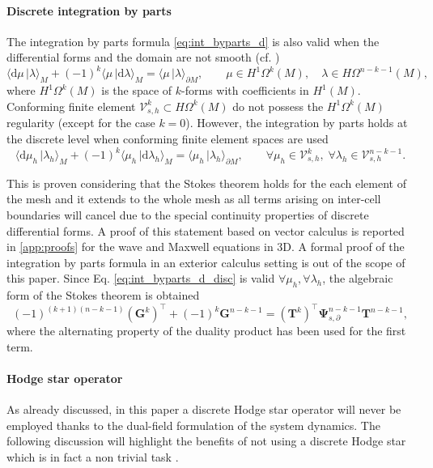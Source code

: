 \documentclass{elsarticle}
\newcommand{\revOne}[1]{{\color{black}#1}}
\newcommand{\revTwo}[1]{{\color{black}#1}}
\renewcommand\d{\ensuremath{\mathrm{d}}}
\newcommand{\dualpr}[3][]{\ensuremath{\langle #2 \, \vert #3 \rangle_{#1}}}
\begin{document}
\revTwo{
\paragraph{Discrete integration by parts}
The integration by parts formula \eqref{eq:int_byparts_d} is also valid when the differential forms and the domain are not smooth (cf. \cite[Theorem 6.3]{arnold2018finite})
\begin{equation}\label{eq:int_byparts_d_H}
    \dualpr[M]{\d{\mu}}{\lambda} + (-1)^k \dualpr[M]{\mu}{\d{\lambda}} = \dualpr[\partial M]{\mu}{\lambda}, \qquad \mu \in H^1\Omega^{k}(M), \quad \lambda \in H \Omega^{n-k-1}(M),
\end{equation}
where $H^1\Omega^{k}(M)$ is the space of $k$-forms with coefficients in $H^1(M)$. Conforming finite element $\mathcal{V}_{s,h}^k \subset H\Omega^k(M)$ do not possess the $H^1\Omega^{k}(M)$ regularity (except for the case $k=0$). However, the integration by parts holds at the discrete level when conforming finite element spaces are used
\begin{equation}\label{eq:int_byparts_d_disc}
    \dualpr[M]{\d\mu_h}{\lambda_h} + (-1)^k\dualpr[M]{\mu_h}{\d\lambda_h} = \dualpr[\partial M ]{\mu_h}{\lambda_h}, \qquad  \forall \mu_h \in \mathcal{V}_{s,h}^k, \; \forall\lambda_h \in \mathcal{V}_{s,h}^{n-k-1}.
\end{equation}
}
\revOne{
This is proven considering that the Stokes theorem holds for the each element of the mesh and it extends to the whole mesh as all terms arising on inter-cell boundaries will cancel due to the special continuity properties of discrete differential forms. A proof of this statement based on vector calculus is reported in \ref{app:proofs} for the wave and Maxwell equations in 3D. A formal proof of the integration by parts formula in an exterior calculus setting is out of the scope of this paper. Since Eq. \eqref{eq:int_byparts_d_disc} is valid $\forall \mu_h, \forall \lambda_h$, the algebraic form of the Stokes theorem is obtained
\begin{equation}\label{eq:alg_StokesTh}
(-1)^{(k+1)(n-k-1)}(\mathbf{G}^{k})^\top + (-1)^k \mathbf{G}^{n-k-1} = (\mathbf{T}^{k})^\top \bm{\Psi}_{s, \partial}^{n-k-1} \mathbf{T}^{n-k-1},
\end{equation}
where the alternating property of the duality product has been used for the first term.
}
\paragraph{Hodge star operator}
As already discussed, in this paper a discrete Hodge star operator will never be employed thanks to the dual-field formulation of the system dynamics. The following discussion will highlight the benefits of not using a discrete Hodge star which is in fact a non trivial task \cite{hiptmair2001}.
\end{document}
